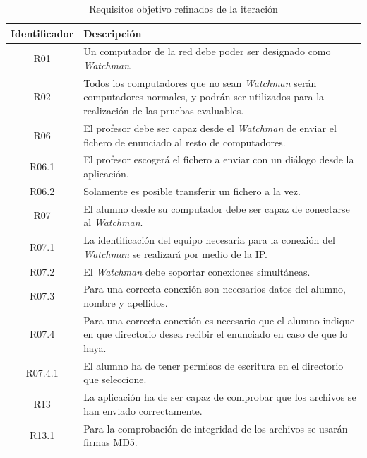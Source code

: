 \begin{table}
    \begin{tabular}{|c|p{12cm}|}
        \hline
        \textbf{Identificador} & \textbf{Descripción}
        \\ \hline

        R01 & Un computador de la red debe poder ser designado como \emph{Watchman}.
        \\ \hline

        R02 & Todos los computadores que no sean \emph{Watchman} serán computadores
        normales, y podrán ser utilizados para la realización de las pruebas evaluables.
        \\ \hline

        R06 & El profesor debe ser capaz desde el \emph{Watchman} de enviar el fichero de enunciado al resto de computadores.
        \\ \hline

        R06.1 & El profesor escogerá el fichero a enviar con un diálogo desde la aplicación.
        \\ \hline

        R06.2 & Solamente es posible transferir un fichero a la vez.
        \\ \hline

        R07 & El alumno desde su computador debe ser capaz de conectarse al \emph{Watchman}.
        \\ \hline

        R07.1 & La identificación del equipo necesaria para la conexión del \emph{Watchman} se realizará por medio de la IP.
        \\ \hline

        R07.2 & El \emph{Watchman} debe soportar conexiones simultáneas.
        \\ \hline

        R07.3 & Para una correcta conexión son necesarios datos del alumno, nombre y apellidos.
        \\ \hline

        R07.4 & Para una correcta conexión es necesario que el alumno indique en que directorio desea recibir el enunciado en caso de que lo haya.
        \\ \hline

        R07.4.1 & El alumno ha de tener permisos de escritura en el directorio que seleccione.
        \\ \hline

        R13 & La aplicación ha de ser capaz de comprobar que los archivos se han enviado correctamente.
        \\ \hline

        R13.1 & Para la comprobación de integridad de los archivos se usarán firmas MD5.
        \\ \hline

    \end{tabular}
    \caption{Requisitos objetivo refinados de la iteración}
    \label{tabla:iteracion1:requisitosObjetivoRefinados}
\end{table}


